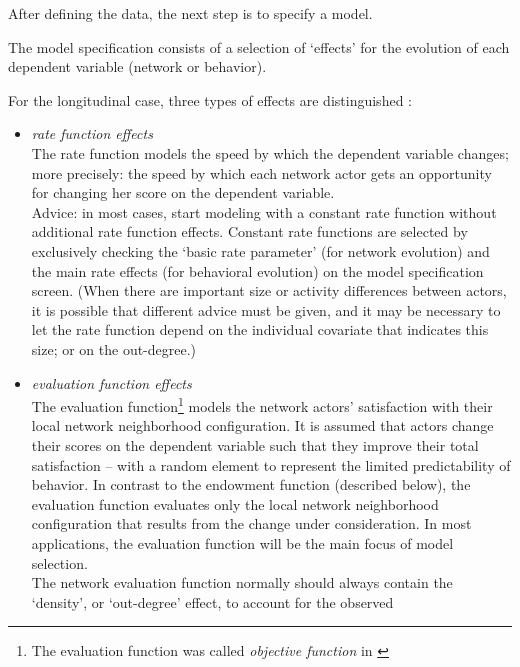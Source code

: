 \documentclass[a4paper,fleqn]{article}
\newcommand{\+}{\, + \,}
\newcommand{\SI}{{\sf SIENA }}
\begin{document}
{After defining the data, the next step is to specify a model.\medskip

The model specification consists of a selection of `effects' for
the evolution of each dependent variable (network or behavior).

For the longitudinal case, three types of
effects are distinguished \citep*[see][]{Snijders01, SnijdersEA10b}:

\begin{itemize}
\item {\em rate function effects}\\
The rate function models the speed by which the dependent variable
changes; more precisely: the speed by which each network actor
gets an opportunity for changing her score on the dependent
variable.\\
Advice: in most cases, start modeling with a constant rate function without
additional rate function effects. Constant rate functions are
selected by exclusively checking the `basic rate parameter' (for
network evolution) and the main rate effects (for behavioral
evolution) on the {\sf model specification} screen.
(When there are important size or activity differences between
actors, it is possible that different advice must be given,
and it may be necessary to let the rate function
depend on the individual covariate that indicates this size;
or on the out-degree.)
\item {\em evaluation function effects}\\
The evaluation function\footnote{The evaluation function was called
\emph{objective function} in \citet{Snijders01}} models the network actors' satisfaction with their local
network neighborhood configuration. It is assumed that actors
change their scores on the dependent variable such that they
improve their total satisfaction -- with a random element
to represent the limited predictability of behavior.
In contrast to the endowment
function (described below), the evaluation function evaluates only
the local network neighborhood configuration that results from the
change under consideration.
In most applications, the evaluation function will
be the main focus of model selection.\\
The network evaluation function normally should always contain the
`density', or `out-degree' effect, to account for the observed

\end{itemize}}
\end{document}
